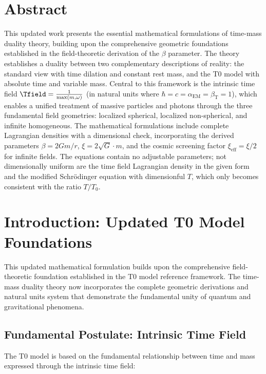 \section*{Abstract}
		This updated work presents the essential mathematical formulations of time-mass duality theory, building upon the comprehensive geometric foundations established in the field-theoretic derivation of the $\beta$ parameter. The theory establishes a duality between two complementary descriptions of reality: the standard view with time dilation and constant rest mass, and the T0 model with absolute time and variable mass. Central to this framework is the intrinsic time field $\Tfield = \frac{1}{\max(m, \omega)}$ (in natural units where $\hbar = c = \alpha_{\text{EM}} = \beta_{\text{T}} = 1$), which enables a unified treatment of massive particles and photons through the three fundamental field geometries: localized spherical, localized non-spherical, and infinite homogeneous. The mathematical formulations include complete Lagrangian densities with a dimensional check, incorporating the derived parameters $\beta = 2Gm/r$, $\xi = 2\sqrt{G} \cdot m$, and the cosmic screening factor $\xi_{\text{eff}} = \xi/2$ for infinite fields. The equations contain no adjustable parameters; not dimensionally uniform are the time field Lagrangian density in the given form and the modified Schrödinger equation with dimensionful $T$, which only becomes consistent with the ratio $T/T_0$.

	
	
	
	\section{Introduction: Updated T0 Model Foundations}
	
	This updated mathematical formulation builds upon the comprehensive field-theoretic foundation established in the T0 model reference framework. The time-mass duality theory now incorporates the complete geometric derivations and natural units system that demonstrate the fundamental unity of quantum and gravitational phenomena.
	
	\subsection{Fundamental Postulate: Intrinsic Time Field}
	\label{subsec:fundamental_postulate}
	
	The T0 model is based on the fundamental relationship between time and mass expressed through the intrinsic time field:
	
